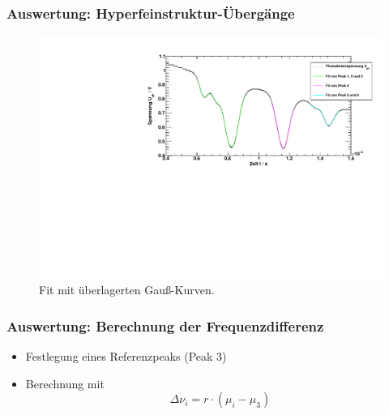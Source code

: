 \begin{frame}
\frametitle{Auswertung: Hyperfeinstruktur-Übergänge}
\begin{figure}[H]
    \centering
    \includegraphics[width=\textwidth]{../img/down-hfs_zoom_fit.pdf}  %
    \caption{Fit mit überlagerten Gauß-Kurven.}
\end{figure}
\end{frame}


\begin{frame}
\frametitle{Auswertung: Berechnung der Frequenzdifferenz}
\begin{itemize}[<+->]
    \item Festlegung eines Referenzpeaks (Peak 3)
    \item Berechnung mit
    \begin{equation*}
        \Delta \nu_i = r \cdot \left( \mu_i - \mu_3 \right)
    \end{equation*}
\end{itemize}
\end{frame}



